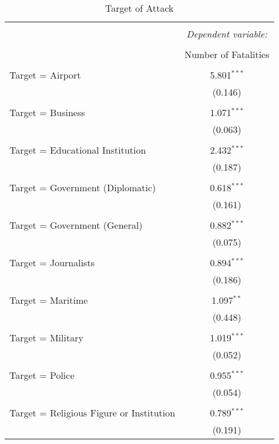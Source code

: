 
\begin{table}[!htbp] \centering 
  \caption{Target of Attack} 
  \label{} 
\begin{tabular}{@{\extracolsep{5pt}}lc} 
\\[-1.8ex]\hline 
\hline \\[-1.8ex] 
 & \multicolumn{1}{c}{\textit{Dependent variable:}} \\ 
\cline{2-2} 
\\[-1.8ex] & Number of Fatalities \\ 
\hline \\[-1.8ex] 
 Target = Airport & 5.801$^{***}$ \\ 
  & (0.146) \\ 
  & \\ 
 Target = Business & 1.071$^{***}$ \\ 
  & (0.063) \\ 
  & \\ 
 Target = Educational Institution & 2.432$^{***}$ \\ 
  & (0.187) \\ 
  & \\ 
 Target = Government (Diplomatic) & 0.618$^{***}$ \\ 
  & (0.161) \\ 
  & \\ 
 Target =  Government (General) & 0.882$^{***}$ \\ 
  & (0.075) \\ 
  & \\ 
 Target = Journalists & 0.894$^{***}$ \\ 
  & (0.186) \\ 
  & \\ 
 Target = Maritime & 1.097$^{**}$ \\ 
  & (0.448) \\ 
  & \\ 
 Target = Military & 1.019$^{***}$ \\ 
  & (0.052) \\ 
  & \\ 
 Target = Police & 0.955$^{***}$ \\ 
  & (0.054) \\ 
  & \\ 
 Target = Religious Figure or Institution & 0.789$^{***}$ \\ 
  & (0.191) \\ 

\end{tabular}
\end{table}
